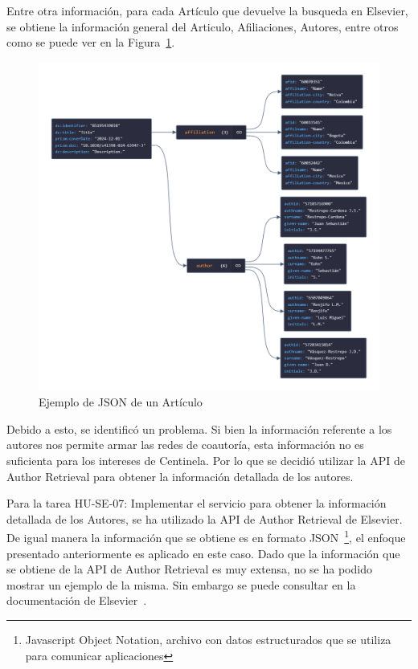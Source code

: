 Entre otra información, para cada Artículo que devuelve la busqueda en Elsevier, se obtiene la información general del Articulo,
Afiliaciones, Autores, entre otros como se puede ver en la Figura~\ref{fig:article-json}.
\begin{figure}[!ht]
    \centering
    \includegraphics[scale=0.3]{../02Figures/02Chapter/Sprints/Sprint-5/article_json.png}
    \caption{Ejemplo de JSON de un Artículo}\label{fig:article-json}
\end{figure}

Debido a esto, se identificó un problema. Si bien la información referente a los autores nos permite armar las redes de coautoría, esta información no es suficienta para los intereses de Centinela.
Por lo que se decidió utilizar la API de  Author Retrieval para obtener la información detallada de los autores.

Para la tarea HU-SE-07: Implementar el servicio para obtener la información detallada de los Autores, se ha utilizado la API de Author Retrieval de Elsevier.
De igual manera la información que se obtiene es en formato JSON~\footnote{Javascript Object Notation, archivo con datos estructurados que se utiliza para comunicar aplicaciones}, el enfoque presentado anteriormente es aplicado en este caso.
Dado que la información que se obtiene de la API de Author Retrieval es muy extensa, no se ha podido mostrar un ejemplo de la misma.
Sin embargo se puede consultar en la documentación de Elsevier~\cite{ElSEVIER}.

